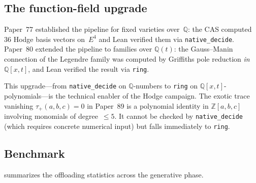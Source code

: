 \documentclass[11pt]{article}
\theoremstyle{plain}
\theoremstyle{definition}
\theoremstyle{remark}
\newcommand{\ZZ}{\mathbb{Z}}
\newcommand{\QQ}{\mathbb{Q}}
\begin{document}
\subsection{The function-field upgrade}

Paper~77 \cite{p77} established the pipeline for fixed varieties
over~$\QQ$: the CAS computed 36 Hodge basis vectors on~$E^4$ and
Lean verified them via \texttt{native\_decide}.  Paper~80 \cite{p80}
extended the pipeline to families over $\QQ(t)$: the Gauss--Manin
connection of the Legendre family was computed by Griffiths pole
reduction \emph{in} $\QQ[x,t]$, and Lean verified the result via
\texttt{ring}.

This upgrade---from \texttt{native\_decide} on $\QQ$-numbers to
\texttt{ring} on $\QQ[x,t]$-polynomials---is the technical
enabler of the Hodge campaign.  The exotic trace vanishing
$\tau_+(a,b,c) = 0$ in Paper~89 is a polynomial identity in
$\ZZ[a,b,c]$ involving monomials of degree~$\leq 5$.  It cannot
be checked by \texttt{native\_decide} (which requires concrete
numerical input) but falls immediately to \texttt{ring}.

\subsection{Benchmark}

 summarizes the offloading statistics
across the generative phase.
\end{document}
